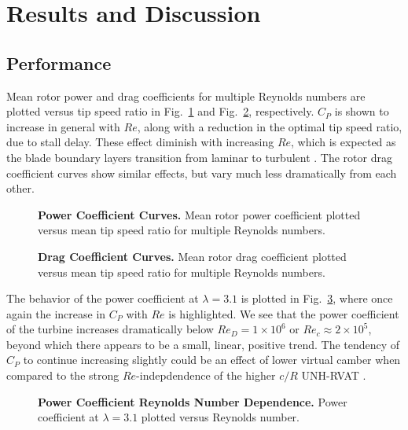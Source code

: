 \documentclass[10pt,letterpaper]{article}
\begin{document}

\section*{Results and Discussion}

\subsection*{Performance}

Mean rotor power and drag coefficients for multiple Reynolds numbers are plotted
versus tip speed ratio in Fig.~\ref{fig:cp-curves} and Fig.~\ref{fig:cd-curves},
respectively. $C_P$ is shown to increase in general with $Re$, along with a
reduction in the optimal tip speed ratio, due to stall delay. These effect
diminish with increasing $Re$, which is expected as the blade boundary layers
transition from laminar to turbulent \cite{Lissaman1983,
Bachant2015-RVAT-Re-dep}. The rotor drag coefficient curves show similar
effects, but vary much less dramatically from each other.

\begin{figure}[h]
\caption{{\bf Power Coefficient Curves.}
Mean rotor power coefficient plotted versus mean tip speed ratio for multiple
Reynolds numbers.}
\label{fig:cp-curves}
\end{figure}

\begin{figure}[h]
\caption{{\bf Drag Coefficient Curves.}
Mean rotor drag coefficient plotted versus mean tip speed ratio for multiple
Reynolds numbers.}
\label{fig:cd-curves}
\end{figure}


The behavior of the power coefficient at $\lambda=3.1$ is plotted in
Fig.~\ref{fig:cp-re-dep}, where once again the increase in $C_P$ with $Re$ is
highlighted. We see that the power coefficient of the turbine increases
dramatically below $Re_D = 1 \times 10^6$ or $Re_c \approx 2 \times 10^5$,
beyond which there appears to be a small, linear, positive trend. The tendency
of $C_P$ to continue increasing slightly could be an effect of lower virtual
camber when compared to the strong $Re$-indepdendence of the higher $c/R$
UNH-RVAT \cite{Bachant2015-RVAT-Re-dep}.

\begin{figure}[h]
\caption{{\bf Power Coefficient Reynolds Number Dependence.}
Power coefficient at $\lambda=3.1$ plotted versus Reynolds number.}
\label{fig:cp-re-dep}
\end{figure}
\end{document}
